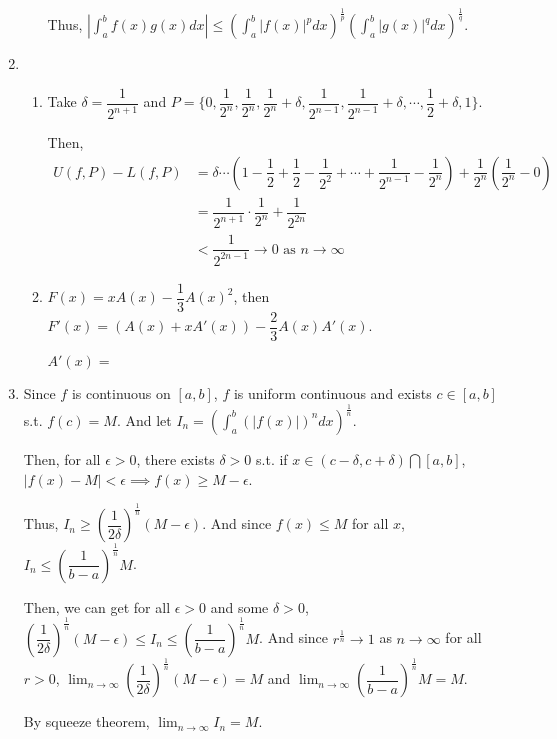 \documentclass[12pt]{article}
\begin{document}
\begin{enumerate}
\begin{enumerate}
        \newpage
        Thus, $|\displaystyle\int_a^b f(x) g(x) dx| \leq (\displaystyle\int_a^b |f(x)|^p dx)^{\frac{1}{p}} (\displaystyle\int_a^b |g(x)|^q dx)^{\frac{1}{q}}$.
    \end{enumerate}

    \item \begin{enumerate}
        \item Take $\delta = \dfrac{1}{2^{n+1}}$ and $P = \lbrace 0, \dfrac{1}{2^n}, \dfrac{1}{2^n}, \dfrac{1}{2^n} + \delta, \dfrac{1}{2^{n-1}}, \dfrac{1}{2^{n-1}} + \delta, \cdots, \dfrac{1}{2}+\delta, 1\rbrace$.

        Then, \begin{align*}
            U(f, P) - L(f, P) &= \delta \cdots (1 - \dfrac{1}{2} +\dfrac{1}{2} - \dfrac{1}{2^2} + \cdots + \dfrac{1}{2^{n-1}}-\dfrac{1}{2^n}) + \dfrac{1}{2^n}(\dfrac{1}{2^n} - 0)\\
            &= \dfrac{1}{2^{n+1}} \cdot \dfrac{1}{2^n} + \dfrac{1}{2^{2n}}\\
            &< \dfrac{1}{2^{2n-1}} \to 0\text{ as } n\to \infty
        \end{align*}

            \item $F(x) = xA(x) - \dfrac{1}{3}A(x)^2$, then $F'(x) = (A(x) + xA'(x)) - \dfrac{2}{3} A(x) A'(x)$.
            
            $A'(x) = $
    \end{enumerate}
    
    \item Since $f$ is continuous on $[a, b]$, $f$ is uniform continuous and exists $c\in [a, b]$ s.t. $f(c) = M$.
    And let $I_n = (\displaystyle\int_a^b (|f(x)|)^n dx)^{\frac{1}{n}}$.
    
    Then, for all $\epsilon > 0$, there exists $\delta > 0$ s.t. if $x \in (c-\delta, c+\delta)\bigcap [a, b]$,
    $|f(x) - M| < \epsilon\implies f(x) \geq M - \epsilon$.

    Thus, $I_n \geq (\dfrac{1}{2\delta})^{\frac{1}{n}}(M-\epsilon)$.
    And since $f(x) \leq M$ for all $x$, $I_n \leq (\dfrac{1}{b-a})^\frac{1}{n} M$.

    Then, we can get for all $\epsilon > 0$ and some $\delta > 0$, $(\dfrac{1}{2\delta})^{\frac{1}{n}}(M-\epsilon) \leq I_n \leq (\dfrac{1}{b-a})^\frac{1}{n} M$.
    And since $r^{\frac{1}{n}} \to 1$ as $n \to \infty$ for all $r > 0$, $\displaystyle\lim_{n\to \infty} (\dfrac{1}{2\delta})^{\frac{1}{n}}(M-\epsilon) =M$ and $\displaystyle\lim_{n\to\infty} (\dfrac{1}{b-a})^\frac{1}{n} M = M$.
    
    By squeeze theorem, $\displaystyle\lim_{n\to\infty} I_n = M$.
\end{enumerate}
\end{document}
